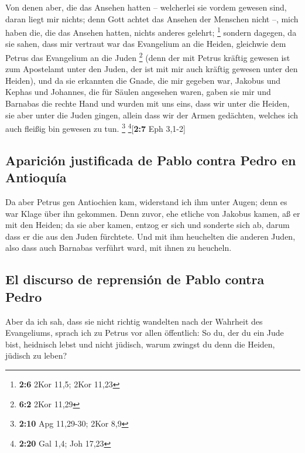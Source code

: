  Von denen aber, die das Ansehen hatten -- welcherlei sie
vordem gewesen sind, daran liegt mir nichts; denn Gott achtet das
Ansehen der Menschen nicht --, mich haben die, die das Ansehen hatten,
nichts anderes gelehrt; \footnote{\textbf{2:6} 2Kor 11,5; 2Kor 11,23}
 sondern dagegen, da sie sahen, dass mir vertraut war das
Evangelium an die Heiden, gleichwie dem Petrus das Evangelium an die
Juden \footnote{\textbf{6:2} 2Kor 11,29}  (denn der mit
Petrus kräftig gewesen ist zum Apostelamt unter den Juden, der ist mit
mir auch kräftig gewesen unter den Heiden),  und da sie
erkannten die Gnade, die mir gegeben war, Jakobus und Kephas und
Johannes, die für Säulen angesehen waren, gaben sie mir und Barnabas die
rechte Hand und wurden mit uns eins, dass wir unter die Heiden, sie aber
unter die Juden gingen,  allein dass wir der Armen
gedächten, welches ich auch fleißig bin gewesen zu tun. \footnote{\textbf{2:10}
  Apg 11,29-30; 2Kor 8,9} \footnote{\textbf{2:20} Gal 1,4; Joh 17,23}{[}\textbf{2:7}
Eph 3,1-2{]}

\hypertarget{apariciuxf3n-justificada-de-pablo-contra-pedro-en-antioquuxeda}{%
\subsection{Aparición justificada de Pablo contra Pedro en
Antioquía}\label{apariciuxf3n-justificada-de-pablo-contra-pedro-en-antioquuxeda}}

 Da aber Petrus gen Antiochien kam, widerstand ich ihm
unter Augen; denn es war Klage über ihn gekommen.  Denn
zuvor, ehe etliche von Jakobus kamen, aß er mit den Heiden; da sie aber
kamen, entzog er sich und sonderte sich ab, darum dass er die aus den
Juden fürchtete.  Und mit ihm heuchelten die anderen
Juden, also dass auch Barnabas verführt ward, mit ihnen zu heucheln.

\hypertarget{el-discurso-de-reprensiuxf3n-de-pablo-contra-pedro}{%
\subsection{El discurso de reprensión de Pablo contra
Pedro}\label{el-discurso-de-reprensiuxf3n-de-pablo-contra-pedro}}

 Aber da ich sah, dass sie nicht richtig wandelten nach
der Wahrheit des Evangeliums, sprach ich zu Petrus vor allen öffentlich:
So du, der du ein Jude bist, heidnisch lebst und nicht jüdisch, warum
zwingst du denn die Heiden, jüdisch zu leben?

